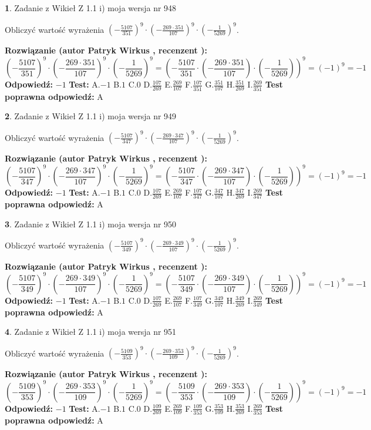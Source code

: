 \documentclass[12pt, a4paper]{article}
\theoremstyle{definition} %
\newtheorem{zad}{}
\newcommand{\zadStart}[1]{\begin{zad}#1\newline}
\newcommand{\zadStop}{\end{zad}}
\newcommand{\rozwStart}[2]{\noindent \textbf{Rozwiązanie (autor #1 , recenzent #2): }\newline}
\newcommand{\rozwStop}{\newline}
\newcommand{\odpStart}{\noindent \textbf{Odpowiedź:}\newline}
\newcommand{\odpStop}{\newline}
\newcommand{\testStart}{\noindent \textbf{Test:}\newline}
\newcommand{\testStop}{\newline}
\newcommand{\kluczStart}{\noindent \textbf{Test poprawna odpowiedź:}\newline}
\newcommand{\kluczStop}{\newline}
\begin{document}
\zadStart{Zadanie z Wikieł Z 1.1 i) moja wersja nr 948}

Obliczyć wartość wyrażenia $(-\frac{5107}{351})^{9} \cdot (-\frac{269 \cdot 351}{107})^{9} \cdot (-\frac{1}{5269})^{9}$.
\zadStop
\rozwStart{Patryk Wirkus}{}
$$(-\frac{5107}{351})^{9} \cdot (-\frac{269 \cdot 351}{107})^{9} \cdot (-\frac{1}{5269})^{9} = (-\frac{5107}{351} \cdot (-\frac{269 \cdot 351}{107}) \cdot (-\frac{1}{5269}))^{9} = (-1)^{9} = -1$$
\rozwStop
\odpStart
$-1$
\odpStop
\testStart
A.$-1$ B.$1$ C.$0$ D.$\frac{107}{269}$ E.$\frac{269}{107}$
F.$\frac{107}{351}$ G.$\frac{351}{107}$
H.$\frac{351}{269}$
I.$\frac{269}{351}$
\testStop
\kluczStart
A
\kluczStop



\zadStart{Zadanie z Wikieł Z 1.1 i) moja wersja nr 949}

Obliczyć wartość wyrażenia $(-\frac{5107}{347})^{9} \cdot (-\frac{269 \cdot 347}{107})^{9} \cdot (-\frac{1}{5269})^{9}$.
\zadStop
\rozwStart{Patryk Wirkus}{}
$$(-\frac{5107}{347})^{9} \cdot (-\frac{269 \cdot 347}{107})^{9} \cdot (-\frac{1}{5269})^{9} = (-\frac{5107}{347} \cdot (-\frac{269 \cdot 347}{107}) \cdot (-\frac{1}{5269}))^{9} = (-1)^{9} = -1$$
\rozwStop
\odpStart
$-1$
\odpStop
\testStart
A.$-1$ B.$1$ C.$0$ D.$\frac{107}{269}$ E.$\frac{269}{107}$
F.$\frac{107}{347}$ G.$\frac{347}{107}$
H.$\frac{347}{269}$
I.$\frac{269}{347}$
\testStop
\kluczStart
A
\kluczStop



\zadStart{Zadanie z Wikieł Z 1.1 i) moja wersja nr 950}

Obliczyć wartość wyrażenia $(-\frac{5107}{349})^{9} \cdot (-\frac{269 \cdot 349}{107})^{9} \cdot (-\frac{1}{5269})^{9}$.
\zadStop
\rozwStart{Patryk Wirkus}{}
$$(-\frac{5107}{349})^{9} \cdot (-\frac{269 \cdot 349}{107})^{9} \cdot (-\frac{1}{5269})^{9} = (-\frac{5107}{349} \cdot (-\frac{269 \cdot 349}{107}) \cdot (-\frac{1}{5269}))^{9} = (-1)^{9} = -1$$
\rozwStop
\odpStart
$-1$
\odpStop
\testStart
A.$-1$ B.$1$ C.$0$ D.$\frac{107}{269}$ E.$\frac{269}{107}$
F.$\frac{107}{349}$ G.$\frac{349}{107}$
H.$\frac{349}{269}$
I.$\frac{269}{349}$
\testStop
\kluczStart
A
\kluczStop



\zadStart{Zadanie z Wikieł Z 1.1 i) moja wersja nr 951}

Obliczyć wartość wyrażenia $(-\frac{5109}{353})^{9} \cdot (-\frac{269 \cdot 353}{109})^{9} \cdot (-\frac{1}{5269})^{9}$.
\zadStop
\rozwStart{Patryk Wirkus}{}
$$(-\frac{5109}{353})^{9} \cdot (-\frac{269 \cdot 353}{109})^{9} \cdot (-\frac{1}{5269})^{9} = (-\frac{5109}{353} \cdot (-\frac{269 \cdot 353}{109}) \cdot (-\frac{1}{5269}))^{9} = (-1)^{9} = -1$$
\rozwStop
\odpStart
$-1$
\odpStop
\testStart
A.$-1$ B.$1$ C.$0$ D.$\frac{109}{269}$ E.$\frac{269}{109}$
F.$\frac{109}{353}$ G.$\frac{353}{109}$
H.$\frac{353}{269}$
I.$\frac{269}{353}$
\testStop
\kluczStart
A
\kluczStop
\end{document}
